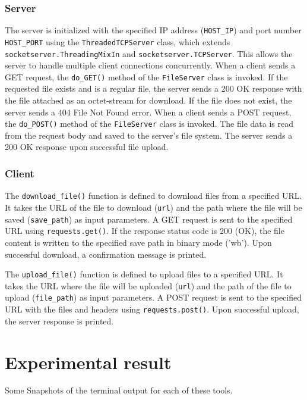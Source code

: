 \documentclass[11pt]{article}
\begin{document}
    \subsubsection{Server}
The server is initialized with the specified IP address (\texttt{HOST\_IP}) and port number \texttt{HOST\_PORT} using the \texttt{ThreadedTCPServer} class, which extends \newline
\texttt{socketserver.ThreadingMixIn} and \texttt{socketserver.TCPServer}. This allows the server to handle multiple client connections concurrently.
        When a client sends a GET request, the \texttt{do\_GET()} method of the \texttt{FileServer} class is invoked. If the requested file exists and is a regular file, the server sends a 200 OK response with the file attached as an octet-stream for download. If the file does not exist, the server sends a 404 File Not Found error.
        When a client sends a POST request, the \texttt{do\_POST()} method of the \texttt{FileServer} class is invoked. The file data is read from the request body and saved to the server's file system. The server sends a 200 OK response upon successful file upload.

\subsubsection{Client}

The \texttt{download\_file()} function is defined to download files from a specified URL. It takes the URL of the file to download (\texttt{url}) and the path where the file will be saved (\texttt{save\_path}) as input parameters. A GET request is sent to the specified URL using \texttt{requests.get()}. If the response status code is 200 (OK), the file content is written to the specified save path in binary mode ('wb'). Upon successful download, a confirmation message is printed.


The \texttt{upload\_file()} function is defined to upload files to a specified URL. It takes the URL where the file will be uploaded (\texttt{url}) and the path of the file to upload (\texttt{file\_path}) as input parameters. A POST request is sent to the specified URL with the files and headers using \texttt{requests.post()}. Upon successful upload, the server response is printed.


\newpage
\section{Experimental result}
Some Snapshots of the terminal output for each of these tools.
\end{document}
